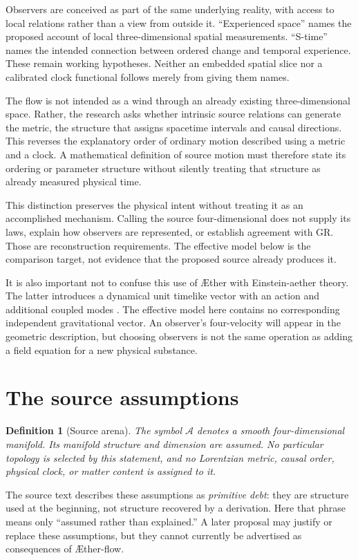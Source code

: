 \documentclass[11pt,oneside]{report}
\newcommand{\Aether}{\AE{}ther}
\newcommand{\Aflow}{\AE{}ther-flow}
\newcommand{\Sub}{\mathcal A}
\newtheorem{definition}{Definition}
\theoremstyle{remark}
\numberwithin{definition}{chapter}
\numberwithin{proposition}{chapter}
\numberwithin{remark}{chapter}
\begin{document}
Observers are conceived as part of the same underlying reality, with access to local relations rather than a view from outside it. ``Experienced space'' names the proposed account of local three-dimensional spatial measurements. ``S-time'' names the intended connection between ordered change and temporal experience. These remain working hypotheses. Neither an embedded spatial slice nor a calibrated clock functional follows merely from giving them names.

The flow is not intended as a wind through an already existing three-dimensional space. Rather, the research asks whether intrinsic source relations can generate the metric, the structure that assigns spacetime intervals and causal directions. This reverses the explanatory order of ordinary motion described using a metric and a clock. A mathematical definition of source motion must therefore state its ordering or parameter structure without silently treating that structure as already measured physical time.

This distinction preserves the physical intent without treating it as an accomplished mechanism. Calling the source four-dimensional does not supply its laws, explain how observers are represented, or establish agreement with GR. Those are reconstruction requirements. The effective model below is the comparison target, not evidence that the proposed source already produces it.

It is also important not to confuse this use of \Aether{} with Einstein-aether theory. The latter introduces a dynamical unit timelike vector with an action and additional coupled modes \parencite{JacobsonMattingly2001,JacobsonMattingly2004}. The effective model here contains no corresponding independent gravitational vector. An observer's four-velocity will appear in the geometric description, but choosing observers is not the same operation as adding a field equation for a new physical substance.

\section{The source assumptions}
\begin{definition}[Source arena]
The symbol $\Sub$ denotes a smooth four-dimensional manifold. Its manifold structure and dimension are assumed. No particular topology is selected by this statement, and no Lorentzian metric, causal order, physical clock, or matter content is assigned to it.
\end{definition}
The source text describes these assumptions as \emph{primitive debt}: they are structure used at the beginning, not structure recovered by a derivation. Here that phrase means only ``assumed rather than explained.'' A later proposal may justify or replace these assumptions, but they cannot currently be advertised as consequences of \Aflow{}.
\end{document}
